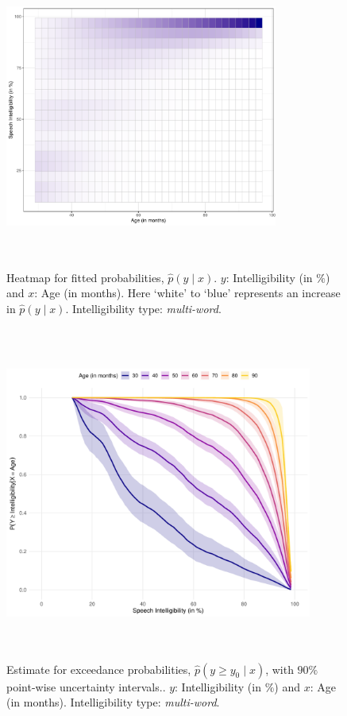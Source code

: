 \documentclass{article}[12pt]
\begin{document}
\begin{figure}[H]
    \centering
    \includegraphics[width = 0.8\textwidth, height = 10cm]{plots/heatmapRDS3MultiWord.pdf}
    \caption{Heatmap for fitted probabilities, $\widehat p(y \mid x)$. $y$: Intelligibility (in $\%$) and $x$: Age (in months). Here `white' to `blue' represents an increase in $\widehat p(y \mid x)$. Intelligibility type: \textit{multi-word}.}
    \label{fig:5}
\end{figure}

\begin{figure}[H]
    \centering
    \includegraphics[width = 0.9\textwidth, height = 11cm]{plots/exceedanceRDS3MultiWord.pdf}
    \caption{Estimate for exceedance probabilities, $\widehat p(y \geq y_0 \mid x)$, with $90\%$ point-wise uncertainty intervals.. $y$: Intelligibility (in $\%$) and $x$: Age (in months). Intelligibility type: \textit{multi-word}.}
    \label{fig:6}
\end{figure}
\end{document}
